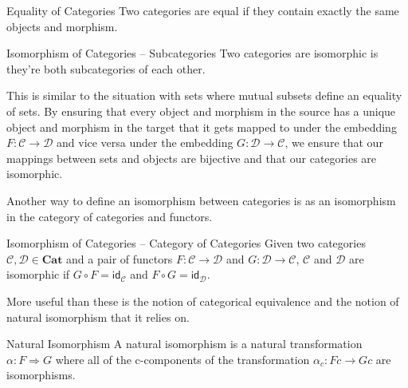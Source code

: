 \documentclass[12pt]{article}
\begin{document}
\begin{definition}{Equality of Categories}{}
    Two categories are equal if they contain exactly the same objects and morphism.
\end{definition}

\begin{definition}{Isomorphism of Categories -- Subcategories}{}
    Two categories are isomorphic is they're both subcategories of each other.
\end{definition}
This is similar to the situation with sets where mutual subsets define an equality of sets.
By ensuring that every object and morphism in the source has a unique object and morphism in the target that it gets mapped to under the embedding $F:\mathcal{C} \rightarrow \mathcal{D}$ and vice versa under the embedding $G:\mathcal{D} \rightarrow \mathcal{C}$,
we ensure that our mappings between sets and objects are bijective and that our categories are isomorphic.

Another way to define an isomorphism between categories is as an isomorphism in the category of categories and functors.
\begin{definition}{Isomorphism of Categories -- Category of Categories}{}
    Given two categories $\mathcal{C}, \mathcal{D} \in \textbf{Cat}$ and a pair of functors $F:\mathcal{C} \rightarrow \mathcal{D}$ and $G:\mathcal{D} \rightarrow \mathcal{C}$,
    $\mathcal{C}$ and $\mathcal{D}$ are isomorphic if $G \circ F = \mathsf{id_\mathcal{C}}$ and $F \circ G = \mathsf{id_\mathcal{D}}$.
\end{definition}


More useful than these is the notion of categorical equivalence and the notion of natural isomorphism that it relies on.

\begin{definition}{Natural Isomorphism}{}
    A natural isomorphism is a natural transformation $\alpha:F\Rightarrow G$ where all of the c-components of the transformation $\alpha_{c}:Fc\rightarrow Gc$ are isomorphisms.
\end{definition}
\end{document}
